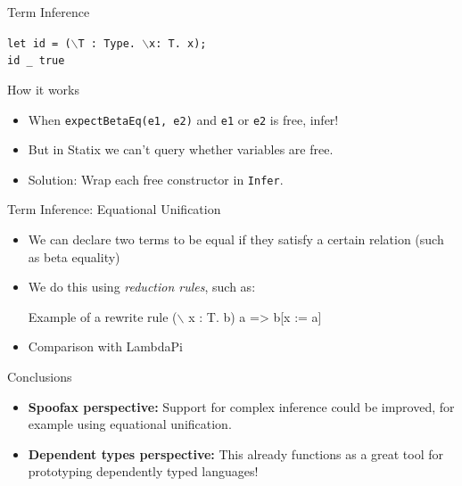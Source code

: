 \documentclass[aspectratio=43]{beamer}
\begin{document}
\begin{frame}{Term Inference}
	\begin{example}\texttt{let id = ($\backslash$T : Type. $\backslash$x: T. x);
	\\id \_ true}
	\end{example}
	\begin{block}{How it works}
		\begin{itemize}
			\item When \texttt{expectBetaEq(e1, e2)} and \texttt{e1} or \texttt{e2} is free, infer!
			\item But in Statix we can't query whether variables are free.
			\item Solution: Wrap each free constructor in \texttt{Infer}.
		\end{itemize}
	\end{block}
\end{frame}

\begin{frame}{Term Inference: Equational Unification}
	\begin{itemize}
		\item We can declare two terms to be equal if they satisfy a certain relation (such as beta equality)
		\item We do this using \emph{reduction rules}, such as:
		\begin{exampleblock}{Example of a rewrite rule}
			($\backslash$ x : T. b) a => b[x := a]
		\end{exampleblock}
		\item Comparison with LambdaPi
	\end{itemize}
\end{frame}

\begin{frame}[fragile]{Conclusions}
	\begin{itemize}
		\item \textbf{Spoofax perspective:} Support for complex inference could be improved, for example using equational unification.
		\item \textbf{Dependent types perspective:} This already functions as a great tool for prototyping dependently typed languages!
	\end{itemize}
\end{frame}
\end{document}
